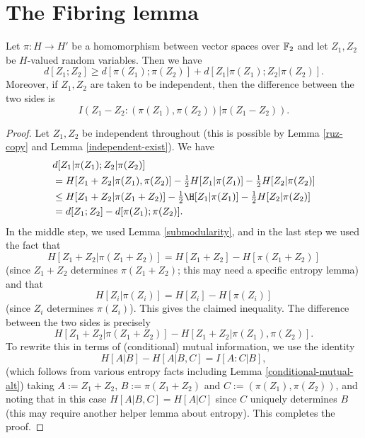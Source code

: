 \chapter{The Fibring lemma}

\begin{proposition}\label{projections-1}
  Let $\pi : H \to H'$ be a homomorphism between vector spaces over $\mathbb{F}_2$ and let $Z_1,Z_2$ be $H$-valued random variables. Then we have
  \[
    d[Z_1; Z_2] \geq d[\pi(Z_1);\pi(Z_2)] + d[Z_1|\pi(Z_1); Z_2 |\pi(Z_2)].
  \]
  Moreover, if $Z_1,Z_2$ are taken to be independent, then the difference between the two sides is
$$I( Z_1 - Z_2 : (\pi(Z_1), \pi(Z_2))  |  \pi(Z_1 - Z_2) ).$$
\end{proposition}


\begin{proof}
  Let $Z_1,Z_2$ be independent throughout (this is possible by Lemma \ref{ruz-copy} and Lemma \ref{independent-exist}).  We have
  \begin{align*}
    & d[Z_1  |\pi(Z_1); Z_2 |\pi(Z_2)] \\
    & = H[ Z_1 + Z_2 | \pi(Z_1),\pi(Z_2)] - \tfrac{1}{2} H[Z_1 | \pi(Z_1)] - \tfrac{1}{2} H[Z_2 | \pi(Z_2)] \\
    & \leq  H[ Z_1 + Z_2 | \pi(Z_1+Z_2)]  - \tfrac{1}{2} \H[Z_1 | \pi(Z_1)] - \tfrac{1}{2}H[Z_2 | \pi(Z_2)] \\
    & = d[Z_1;Z_2] - d[\pi(Z_1);\pi(Z_2)].
  \end{align*}
  In the middle step, we used Lemma \ref{submodularity}, and in the last step we used the fact that
  \[ H[Z_1 + Z_2 |  \pi(Z_1+Z_2)] = H[Z_1 + Z_2] - H[\pi(Z_1+Z_2)]\]
  (since $Z_1 + Z_2$ determines $\pi(Z_1 + Z_2)$; this may need a specific entropy lemma) and that
  \[ H[Z_i| \pi(Z_i)] = H[Z_i] - H[\pi(Z_i)]\] (since $Z_i$ determines $\pi(Z_i)$).
  This gives the claimed inequality. The difference between the two sides is precisely
  \[ H[Z_1 + Z_2  | \pi(Z_1 + Z_2)] - H[Z_1 + Z_2  | \pi(Z_1),\pi(Z_2)].\]
  To rewrite this in terms of (conditional) mutual information, we use the identity
  \[ H[A|B] - H[A | B,C] = I[A : C | B],\]
  (which follows from various entropy facts including Lemma \ref{conditional-mutual-alt})
  taking
  $A := Z_1 + Z_2$, $B := \pi(Z_1 + Z_2)$ and $C := (\pi(Z_1),\pi(Z_{2}))$, and noting that in this case $H[A | B,C] = H[A | C]$ since $C$ uniquely determines $B$ (this may require another helper lemma about entropy).
  This completes the proof.
\end{proof}

